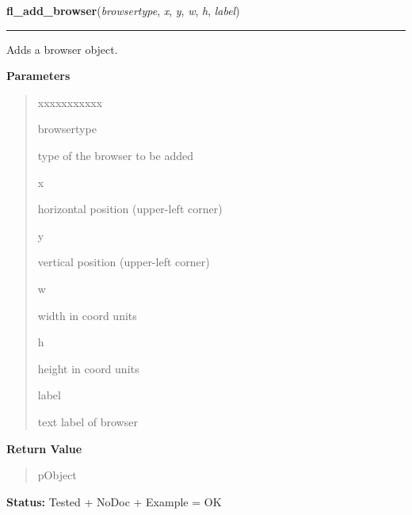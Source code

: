     \label{xformslib:library:fl_add_browser}

    \vspace{0.5ex}

\hspace{.8\funcindent}\begin{boxedminipage}{\funcwidth}

    \raggedright \textbf{fl\_add\_browser}(\textit{browsertype}, \textit{x}, \textit{y}, \textit{w}, \textit{h}, \textit{label})

    \vspace{-1.5ex}

    \rule{\textwidth}{0.5\fboxrule}
\setlength{\parskip}{2ex}
    Adds a browser object.

\setlength{\parskip}{1ex}
      \textbf{Parameters}
      \vspace{-1ex}

      \begin{quote}
        \begin{Ventry}{xxxxxxxxxxx}

          \item[browsertype]

          type of the browser to be added

          \item[x]

          horizontal position (upper-left corner)

          \item[y]

          vertical position (upper-left corner)

          \item[w]

          width in coord units

          \item[h]

          height in coord units

          \item[label]

          text label of browser

        \end{Ventry}

      \end{quote}

      \textbf{Return Value}
    \vspace{-1ex}

      \begin{quote}
      pObject

      \end{quote}

\textbf{Status:} Tested + NoDoc + Example = OK



    \end{boxedminipage}


